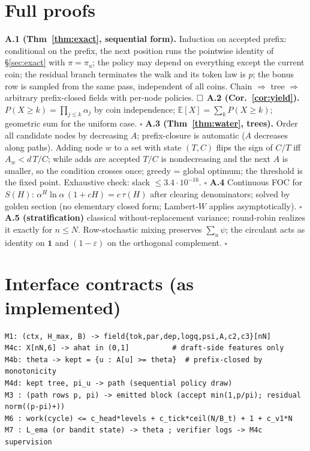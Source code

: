 \documentclass[11pt,a4paper]{article}
\theoremstyle{definition}
\begin{document}
\appendix
\section{Full proofs}
\textbf{A.1 (Thm~\ref{thm:exact}, sequential form).} Induction on accepted
prefix: conditional on the prefix, the next position runs the pointwise
identity of \S\ref{sec:exact} with $\pi=\pi_u$; the policy may depend on
everything except the current coin; the residual branch terminates the walk
and its token law is $p$; the bonus row is sampled from the same pass,
independent of all coins. Chain $\Rightarrow$ tree $\Rightarrow$ arbitrary
prefix-closed fields with per-node policies. $\hfill\square$
\textbf{A.2 (Cor.~\ref{cor:yield}).} $P(X\ge k)=\prod_{j\le k}\alpha_j$ by
coin independence; $\mathbb E[X]=\sum_k P(X\ge k)$; geometric sum for the
uniform case. $\square$
\textbf{A.3 (Thm~\ref{thm:water}, trees).} Order all candidate nodes by
decreasing $A$; prefix-closure is automatic ($A$ decreases along paths).
Adding node $w$ to a set with state $(T,C)$ flips the sign of $C/T$ iff
$A_w < d\,T/C$; while adds are accepted $T/C$ is nondecreasing and the next
$A$ is smaller, so the condition crosses once; greedy = global optimum;
the threshold is the fixed point. Exhaustive check: slack
$\le3.4\cdot10^{-16}$. $\square$
\textbf{A.4} Continuous FOC for $S(H)$:
$\alpha^H\ln\alpha\,(1+cH)=c\,\tau(H)$ after clearing denominators;
solved by golden section (no elementary closed form; Lambert-$W$ applies
asymptotically). $\square$
\textbf{A.5 (stratification)} classical without-replacement variance;
round-robin realizes it exactly for $n\le N$. Row-stochastic mixing
preserves $\sum_u\psi$; the circulant acts as identity on
$\mathbf 1$ and $(1-\varepsilon)$ on the orthogonal complement. $\square$

\section{Interface contracts (as implemented)}
\begin{lstlisting}[style=code]
M1: (ctx, H_max, B) -> field{tok,par,dep,logq,psi,A,c2,c3}[nN]
M4c: X[nN,6] -> ahat in (0,1]          # draft-side features only
M4b: theta -> kept = {u : A[u] >= theta}  # prefix-closed by monotonicity
M4d: kept tree, pi_u -> path (sequential policy draw)
M3 : (path rows p, pi) -> emitted block (accept min(1,p/pi); residual norm((p-pi)+))
M6 : work(cycle) <= c_head*levels + c_tick*ceil(N/B_t) + 1 + c_v1*N
M7 : L_ema (or bandit state) -> theta ; verifier logs -> M4c supervision
\end{lstlisting}
\end{document}
